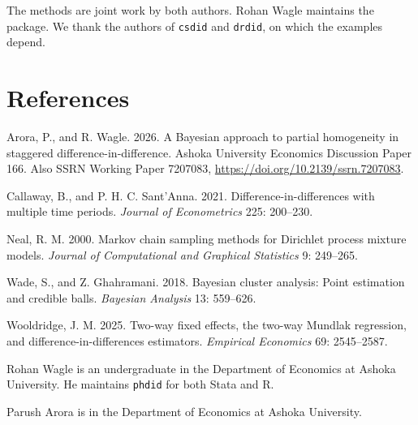 \documentclass{sj}
\begin{document}
The methods are joint work by both authors.  Rohan Wagle maintains the
package.  We thank the authors of \texttt{csdid} and \texttt{drdid}, on which
the examples depend.

\section{References}

\begin{phang}
Arora, P., and R. Wagle. 2026. A Bayesian approach to partial homogeneity in
staggered difference-in-difference. Ashoka University Economics Discussion
Paper 166. Also SSRN Working Paper 7207083,
\url{https://doi.org/10.2139/ssrn.7207083}.
\end{phang}

\begin{phang}
Callaway, B., and P. H. C. Sant'Anna. 2021. Difference-in-differences with
multiple time periods. \emph{Journal of Econometrics} 225: 200--230.
\end{phang}

\begin{phang}
Neal, R. M. 2000. Markov chain sampling methods for Dirichlet process mixture
models. \emph{Journal of Computational and Graphical Statistics} 9: 249--265.
\end{phang}

\begin{phang}
Wade, S., and Z. Ghahramani. 2018. Bayesian cluster analysis: Point estimation
and credible balls. \emph{Bayesian Analysis} 13: 559--626.
\end{phang}

\begin{phang}
Wooldridge, J. M. 2025. Two-way fixed effects, the two-way Mundlak regression,
and difference-in-differences estimators. \emph{Empirical Economics} 69:
2545--2587.
\end{phang}

\aboutauthors

Rohan Wagle is an undergraduate in the Department of Economics at Ashoka
University.  He maintains \texttt{phdid} for both Stata and R.

Parush Arora is in the Department of Economics at Ashoka University.
\end{document}

